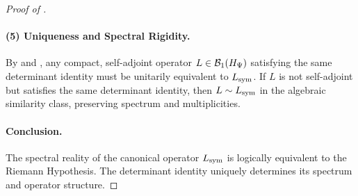 \begin{proof}[Proof of ]
\paragraph{(5) Uniqueness and Spectral Rigidity.}
By  and , any compact, self-adjoint operator \( L \in \mathcal{B}_1(H_{\Psi}) \) satisfying the same determinant identity must be unitarily equivalent to \( L_{\mathrm{sym}} \). If \( L \) is not self-adjoint but satisfies the same determinant identity, then \( L \sim L_{\mathrm{sym}} \) in the algebraic similarity class, preserving spectrum and multiplicities.

\paragraph{Conclusion.}
The spectral reality of the canonical operator \( L_{\mathrm{sym}} \) is logically equivalent to the Riemann Hypothesis. The determinant identity uniquely determines its spectrum and operator structure.
\end{proof}
